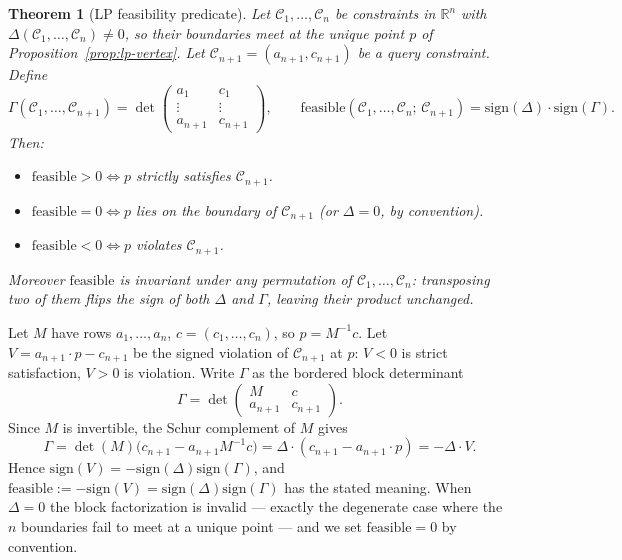\documentclass[12pt]{article}
\makeatletter
\newtheorem{theorem}{Theorem}
\theoremstyle{definition}
\theoremstyle{remark}
\renewenvironment{proof}[1][\proofname]{\par
  \pushQED{\qed}%
  \normalfont \footnotesize \topsep6\p@\@plus6\p@\relax
  \list{}{\leftmargin=2em
          \settowidth{\itemindent}{\itshape#1}%
          \labelwidth=\itemindent
          \parsep=0pt \listparindent=\parindent 
  }
  \item[\hskip\labelsep
        \itshape
    #1\@addpunct{.}]\ignorespaces
}{%
  \popQED\endlist\@endpefalse
}
\makeatother
\begin{document}
\begin{theorem}[LP feasibility predicate]\label{thm:lp-feasible}
Let $\mathcal C_1, \ldots, \mathcal C_n$ be constraints in $\mathbb{R}^n$ with
$\Delta(\mathcal C_1,\ldots,\mathcal C_n) \neq 0$, so their boundaries meet at
the unique point $p$ of Proposition~\ref{prop:lp-vertex}. Let $\mathcal
C_{n+1} = (a_{n+1}, c_{n+1})$ be a query constraint. Define
\begin{equation*}
    \Gamma(\mathcal C_1,\ldots,\mathcal C_{n+1}) = \det \begin{pmatrix} a_1 & c_1 \\ \vdots & \vdots \\ a_{n+1} & c_{n+1} \end{pmatrix},
    \qquad
    \mathrm{feasible}(\mathcal C_1,\ldots,\mathcal C_n;\, \mathcal C_{n+1}) = \mathrm{sign}(\Delta)\cdot \mathrm{sign}(\Gamma).
\end{equation*}
Then:
\begin{itemize}
    \item $\mathrm{feasible} > 0 \iff p$ strictly satisfies $\mathcal C_{n+1}$.
    \item $\mathrm{feasible} = 0 \iff p$ lies on the boundary of $\mathcal
    C_{n+1}$ (or $\Delta = 0$, by convention).
    \item $\mathrm{feasible} < 0 \iff p$ violates $\mathcal C_{n+1}$.
\end{itemize}
Moreover $\mathrm{feasible}$ is invariant under any permutation of $\mathcal
C_1,\ldots,\mathcal C_n$: transposing two of them flips the sign of both
$\Delta$ and $\Gamma$, leaving their product unchanged.
\end{theorem}
\begin{proof}
    Let $M$ have rows $a_1,\ldots,a_n$, $c =
    (c_1,\ldots,c_n)$, so $p = M^{-1}c$. Let $V =
    a_{n+1}\cdot p - c_{n+1}$ be the signed violation of $\mathcal C_{n+1}$ at
    $p$: $V<0$ is strict satisfaction, $V>0$ is violation. Write $\Gamma$ as
    the bordered block determinant
    \begin{equation*}
        \Gamma = \det \begin{pmatrix} M & c \\ a_{n+1} & c_{n+1} \end{pmatrix}.
    \end{equation*}
    Since $M$ is invertible, the Schur complement of $M$ gives
    \begin{equation*}
        \Gamma = \det(M)\big(c_{n+1} - a_{n+1} M^{-1} c\big)
               = \Delta \cdot (c_{n+1} - a_{n+1}\cdot p) = -\Delta \cdot V.
    \end{equation*}
    Hence $\mathrm{sign}(V) = -\mathrm{sign}(\Delta)\mathrm{sign}(\Gamma)$, and
    $\mathrm{feasible} := -\mathrm{sign}(V) = \mathrm{sign}(\Delta)\mathrm{sign}(\Gamma)$
    has the stated meaning. When $\Delta = 0$ the block factorization is
    invalid --- exactly the degenerate case where the $n$ boundaries fail to
    meet at a unique point --- and we set $\mathrm{feasible} = 0$ by
    convention.
\end{proof}
\end{document}

